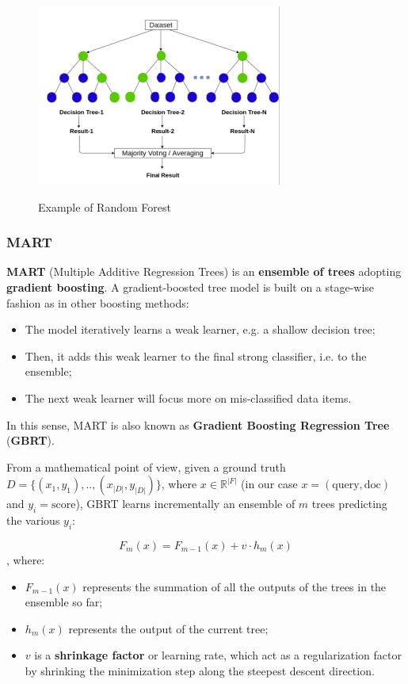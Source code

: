 \begin{figure}[h!]
		\centering
        \includegraphics[scale = 1.8]{img/ensemble of trees.jpg}
		\label{rf}
        \caption{Example of Random Forest}
\end{figure}

\subsubsection{MART}
\textbf{MART} (Multiple Additive Regression Trees) is an \textbf{ensemble of trees} adopting \textbf{gradient boosting}. A gradient-boosted tree model is built on a stage-wise fashion as in other boosting methods:

\begin{itemize}
    \item The model iteratively learns a weak learner, e.g. a shallow decision tree;
    \item Then, it adds this weak learner to the final strong classifier, i.e. to the ensemble;
    \item The next weak learner will focus more on mis-classified data items.
\end{itemize}

In this sense, MART is also known as \textbf{Gradient Boosting Regression Tree} (\textbf{GBRT}).

From a mathematical point of view, given a ground truth $D = \{ (x_1, y_1), .., (x_{|D|}, y_{|D|}) \}$, where $x \in \mathbb{R}^{|F|}$ (in our case $x = (\text{query}, \text{doc})$ and $y_i = \text{score}$), GBRT learns incrementally an ensemble of $m$ trees predicting the various $y_i$:

$$
F_m(x) = F_{m-1}(x) + v \cdot h_m(x)
$$
, where:

\begin{itemize}
    \item $F_{m-1}(x)$ represents the summation of all the outputs of the trees in the ensemble so far;
    \item $h_m(x)$ represents the output of the current tree;
    \item $v$ is a \textbf{shrinkage factor} or learning rate, which act as a regularization factor by shrinking the minimization step along the steepest descent direction.
\end{itemize}

